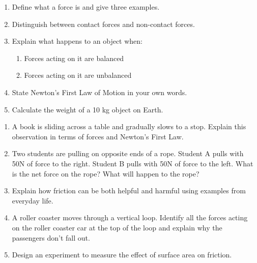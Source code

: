 \documentclass[justified,notoc]{tufte-book}
\newenvironment{tieredquestions}[1]{%
    \begin{tcolorbox}[colback=note!30,colframe=note!50,title=\textbf{Practice Questions - #1}]
}{%
    \end{tcolorbox}
}
\begin{document}
\begin{tieredquestions}{Level 1 - Basic Understanding}
\begin{enumerate}
    \item Define what a force is and give three examples.
    \item Distinguish between contact forces and non-contact forces.
    \item Explain what happens to an object when:
    \begin{enumerate}
        \item Forces acting on it are balanced
        \item Forces acting on it are unbalanced
    \end{enumerate}
    \item State Newton's First Law of Motion in your own words.
    \item Calculate the weight of a 10 kg object on Earth.
\end{enumerate}
\end{tieredquestions}

\begin{tieredquestions}{Level 2 - Application}
\begin{enumerate}
    \item A book is sliding across a table and gradually slows to a stop. Explain this observation in terms of forces and Newton's First Law.
    \item Two students are pulling on opposite ends of a rope. Student A pulls with 50N of force to the right. Student B pulls with 50N of force to the left. What is the net force on the rope? What will happen to the rope?
    \item Explain how friction can be both helpful and harmful using examples from everyday life.
    \item A roller coaster moves through a vertical loop. Identify all the forces acting on the roller coaster car at the top of the loop and explain why the passengers don't fall out.
    \item Design an experiment to measure the effect of surface area on friction.
\end{enumerate}
\end{tieredquestions}
\end{document}
